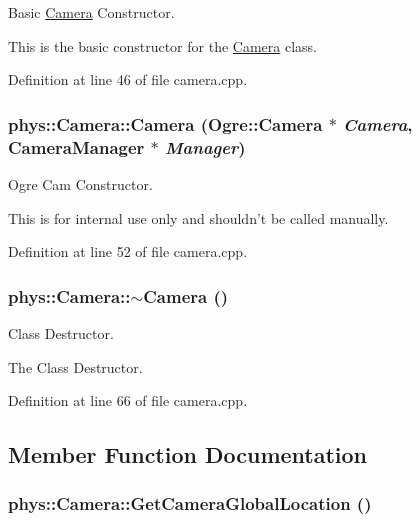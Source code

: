 Basic \hyperlink{classphys_1_1Camera}{Camera} Constructor. 

This is the basic constructor for the \hyperlink{classphys_1_1Camera}{Camera} class. 

Definition at line 46 of file camera.cpp.

\hypertarget{classphys_1_1Camera_a0510d4f9bf6fb195115272cbd116e8dd}{
\subsubsection[{Camera}]{\setlength{\rightskip}{0pt plus 5cm}phys::Camera::Camera (Ogre::Camera $\ast$ {\em Camera}, \/  {\bf CameraManager} $\ast$ {\em Manager})}}
\label{d9/df8/classphys_1_1Camera_a0510d4f9bf6fb195115272cbd116e8dd}


Ogre Cam Constructor. 

This is for internal use only and shouldn't be called manually. 

Definition at line 52 of file camera.cpp.

\hypertarget{classphys_1_1Camera_aa45f340a6f7ba0970aa2602a928463ea}{
\subsubsection[{$\sim$Camera}]{\setlength{\rightskip}{0pt plus 5cm}phys::Camera::$\sim$Camera ()}}
\label{d9/df8/classphys_1_1Camera_aa45f340a6f7ba0970aa2602a928463ea}


Class Destructor. 

The Class Destructor. 

Definition at line 66 of file camera.cpp.



\subsection{Member Function Documentation}
\hypertarget{classphys_1_1Camera_a53b61b6c163270ffb4f46eb66a973b10}{
\subsubsection[{GetCameraGlobalLocation}]{ phys::Camera::GetCameraGlobalLocation ()}}
\label{d9/df8/classphys_1_1Camera_a53b61b6c163270ffb4f46eb66a973b10}


